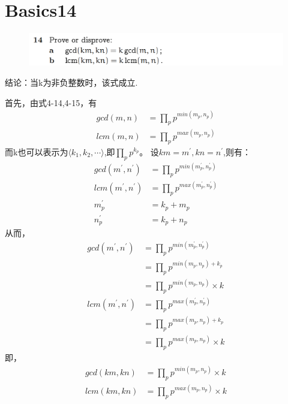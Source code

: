 \documentclass[]{article}
\begin{document}
\section*{Basics14}
\begin{figure}[H]
    \includegraphics[scale = 0.6]{2023-03-13-16-11-35.png}
\end{figure}
结论：当k为非负整数时，该式成立.\par 
首先，由式4-14,4-15，有
\begin{align}
    gcd(m,n) &= \prod_{p}^{}p^{min(m_{p},n_{p})}\\
    lcm(m,n) &= \prod_{p}^{}p^{max(m_{p},n_{p})}
\end{align}
而k也可以表示为$\langle k_{1},k_{2},\cdots  \rangle$,即$\prod_{p}^{}p^{k_{p}}$。
设$km=m^{'},kn=n^{'}$,则有：
\begin{align}
    gcd(m^{'},n^{'}) &= \prod_{p}^{}p^{min(m^{'}_{p},n^{'}_{p})}\\
    lcm(m^{'},n^{'}) &= \prod_{p}^{}p^{max(m^{'}_{p},n^{'}_{p})}\\
    m^{'}_{p} &= k_{p} + m_{p}\\
    n^{'}_{p} &= k_{p} + n_{p}
\end{align}
从而，
\begin{align}
    gcd(m^{'},n^{'}) &= \prod_{p}^{}p^{min(m^{'}_{p},n^{'}_{p})}\\
                    &= \prod_{p}^{}p^{min(m_{p},n_{p}) + k_{p}} \\
                    &=\prod_{p}^{}p^{min(m_{p},n_{p})} \times k \\
    lcm(m^{'},n^{'}) &= \prod_{p}^{}p^{max(m^{'}_{p},n^{'}_{p})} \\
                    &= \prod_{p}^{}p^{max(m_{p},n_{p}) + k_{p}} \\
                    &=\prod_{p}^{}p^{max(m_{p},n_{p})} \times k 
\end{align}
即，
\begin{align}
    gcd(km,kn) &= \prod_{p}^{}p^{min(m_{p},n_{p})} \times k \\
    lcm(km,kn) &=\prod_{p}^{}p^{max(m_{p},n_{p})} \times k 
\end{align}
\end{document}
